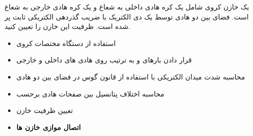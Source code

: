 \begin{ELexample}{}

یک خازن کروی شامل یک کره هادی داخلی به شعاع  و یک کره هادی خارجی به شعاع  است. فضای بین دو هادی توسط یک دی الکتریک با ضریب گذردهی الکتریکی ثابت \ELim{\epsilon} پر شده است. ظرفیت این خازن را تعیین کنید.


\begin{ELsolution}

\begin{itemize}
\tightlist
\item
  استفاده از دستگاه مختصات کروی
\item
  قرار دادن بارهای  و  به ترتیب روی هادی های داخلی و خارجی
\item
  محاسبه شدت میدان الکتریکی با استفاده از قانون گوس در فضای بین دو هادی
\end{itemize}


\begin{itemize}
\tightlist
\item
  محاسبه اختلاف پتانسیل بین صفحات هادی برحسب 
\end{itemize}


\begin{itemize}
\tightlist
\item
  تعیین ظرفیت خازن
\end{itemize}


\end{ELsolution}

\end{ELexample}

\begin{ELunit}

\begin{itemize}
\tightlist
\item
  \textbf{اتصال موازی خازن ها}
\end{itemize}



\end{ELunit}

